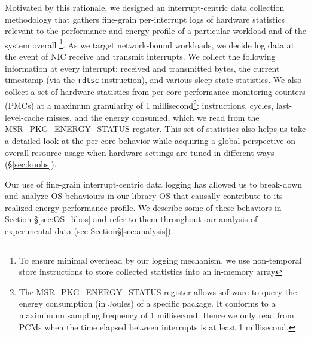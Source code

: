 Motivated by this rationale,
we designed an interrupt-centric data collection methodology
that gathers fine-grain per-interrupt logs
of hardware statistics relevant to
the performance and energy profile
of a particular workload
and of the system overall
\footnote{
To ensure minimal overhead by our logging mechanism,
we use non-temporal store instructions to store collected statistics
into an in-memory array
}.
As we target network-bound workloads,
we decide log data at the event of NIC receive and transmit interrupts.
We collect the following information at every interrupt:
received and transmitted bytes,
the current timestamp (via the \texttt{rdtsc} instruction),
and various sleep state statistics.
We also collect a set of hardware statistics
from per-core performance monitoring counters (PMCs)
at a maximum granularity of 1 millisecond\footnote{
The MSR\_PKG\_ENERGY\_STATUS register allows software to query the energy consumption (in Joules) of a specific package. It conforms to a maximimum sampling frequency of 1 millisecond. Hence we only read from PCMs when the time elapsed between interrupts is at least 1 millisecond.
}:
instructions, cycles, last-level-cache misses, and the energy consumed,
which we read from the MSR\_PKG\_ENERGY\_STATUS register.
This set of statistics also helps us
take a detailed look at the per-core behavior
while acquiring a global perspective on overall resource usage
when hardware settings are tuned in different ways (\S\ref{sec:knobs}).

Our use of fine-grain interrupt-centric data logging
has allowed us to break-down and analyze OS behaviours in our library OS
that causally contribute to its realized energy-performance profile.
We describe some of these behaviors in Section \S\ref{sec:OS_libos} 
and refer to them throughout our analysis of experimental data
(see Section\S\ref{sec:analysis}).




